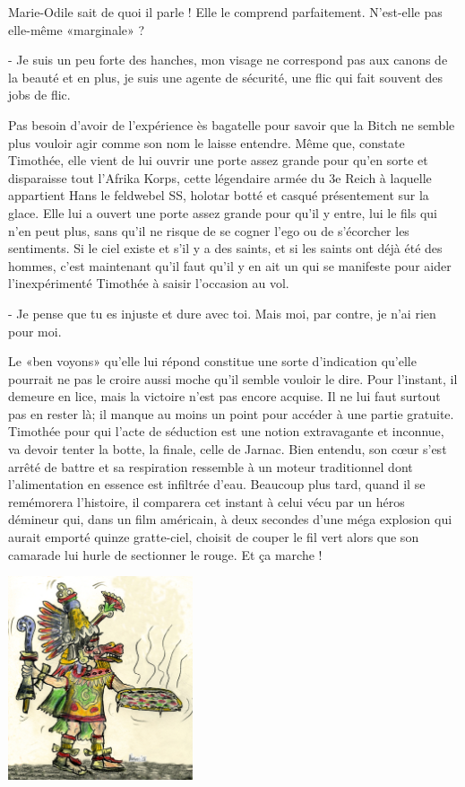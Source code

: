 Marie-Odile sait de quoi il parle ! Elle le comprend parfaitement. N’est-elle pas elle-même «marginale» ?

- Je suis un peu forte des hanches, mon visage ne correspond pas aux canons de la beauté et en plus, je suis une agente de sécurité, une flic qui fait souvent des jobs de flic.

Pas besoin d’avoir de l’expérience ès bagatelle pour savoir que la Bitch ne semble plus vouloir agir comme son nom le laisse entendre. Même que, constate Timothée, elle vient de lui ouvrir une porte assez grande pour qu’en sorte et disparaisse tout l’Afrika Korps, cette légendaire armée du 3e Reich à laquelle appartient Hans le feldwebel SS, holotar botté et casqué présentement sur la glace. Elle lui a ouvert une porte assez grande pour qu’il y entre, lui le fils qui n’en peut plus, sans qu’il ne risque de se cogner l’ego ou de s’écorcher les sentiments. Si le ciel existe et s’il y a des saints, et si les saints ont déjà été des hommes, c’est maintenant qu’il faut qu’il y en ait un qui se manifeste pour aider l’inexpérimenté Timothée à saisir l’occasion au vol.

- Je pense que tu es injuste et dure avec toi. Mais moi, par contre, je n’ai rien pour moi.

Le «ben voyons» qu’elle lui répond constitue une sorte d’indication qu’elle pourrait ne pas le croire aussi moche qu’il semble vouloir le dire. Pour l’instant, il demeure en lice, mais la victoire n’est pas encore acquise. Il ne lui faut surtout pas en rester là; il manque au moins un point pour accéder à une partie gratuite. Timothée pour qui l’acte de séduction est une notion extravagante et inconnue, va devoir tenter la botte, la finale, celle de Jarnac. Bien entendu, son cœur s’est arrêté de battre et sa respiration ressemble à un moteur traditionnel dont l’alimentation en essence est infiltrée d’eau. Beaucoup plus tard, quand il se remémorera l’histoire, il comparera cet instant à celui vécu par un héros démineur qui, dans un film américain, à deux secondes d’une méga explosion qui aurait emporté quinze gratte-ciel, choisit de couper le fil vert alors que son camarade lui hurle de sectionner le rouge. Et ça marche !

\begin{floatingfigure}[l]{60mm}
\includegraphics[height=60mm]{corps/chapitre9/img/personnage-qz.jpg}
\end{floatingfigure}

